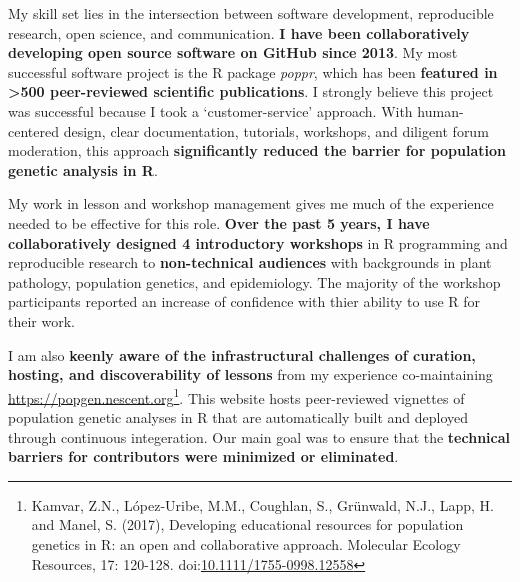 \vspace{1ex}






My skill set lies in the intersection between software development,
reproducible research, open science, and communication.  \textbf{I have been
collaboratively developing open source software on GitHub
since 2013}. My most successful software project is the R package
\textit{poppr}, which has been \textbf{featured in \textgreater500
peer-reviewed scientific publications}. I strongly believe this project was
successful because I took a `customer-service' approach.  With
human-centered design, clear documentation, tutorials, workshops, and diligent
forum moderation, this approach \textbf{significantly reduced the barrier for
population genetic analysis in R}.

\vspace{1ex}

My work in lesson and workshop management gives me much of the experience
needed to be effective for this role. \textbf{Over the past 5 years, I have
collaboratively designed 4 introductory workshops} in R programming and
reproducible research to \textbf{non-technical audiences} with backgrounds in
plant pathology, population genetics, and epidemiology. The majority of the
workshop participants reported an increase of confidence with thier ability to
use R for their work.

\vspace{1ex}

I am also \textbf{keenly aware of the infrastructural challenges of curation, hosting,
and discoverability of lessons} from my experience co-maintaining
\url{https://popgen.nescent.org}\footnote{Kamvar, Z.N., López‐Uribe, M.M.,
Coughlan, S., Grünwald, N.J., Lapp, H. and Manel, S. (2017), Developing
educational resources for population genetics in R: an open and collaborative
approach. Molecular Ecology Resources, 17: 120-128.
doi:\href{https://doi.org/10.1111/1755-0998.12558}{10.1111/1755-0998.12558}}.
This website hosts peer-reviewed vignettes of population
genetic analyses in R that are automatically built and deployed through
continuous integeration. Our main goal was to ensure that the
\textbf{technical barriers for contributors were minimized or eliminated}.

